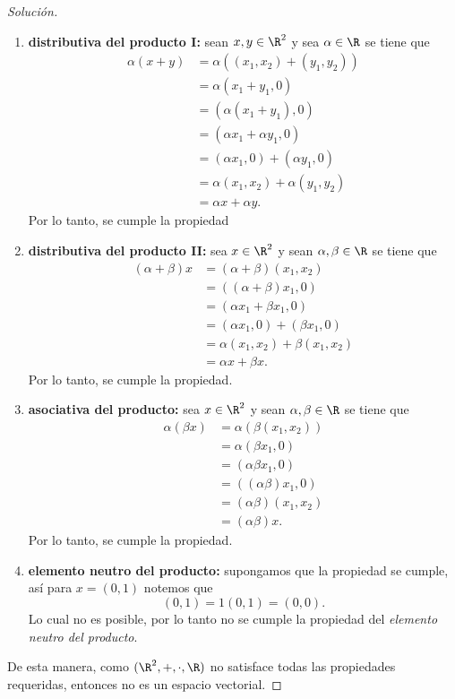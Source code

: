 \documentclass[a4,11pt]{aleph-notas}
\begin{document}
\begin{proof}[Solución]
\begin{enumerate}
    \item \textbf{distributiva del producto I:}
        sean $x,y\in \R^2$ y sea $\alpha\in \R$ se tiene que
        \begin{align*}
            \alpha (x+y) & = \alpha ((x_1,x_2)+(y_1,y_2)) \\
            & = \alpha (x_1+y_1,0)\\
            & = (\alpha(x_1+y_1),0) \\
            & = (\alpha x_1 + \alpha y_1,0)\\
            & = (\alpha x_1,0) + (\alpha y_1,0)\\
            & = \alpha(x_1,x_2) + \alpha (y_1,y_2)\\
            & = \alpha x + \alpha y.
        \end{align*}
        Por lo tanto, se cumple la propiedad
    \item \textbf{distributiva del producto II:}
        sea $x\in \R^2$ y sean $\alpha,\beta\in \R$ se tiene que
        \begin{align*}
            (\alpha + \beta) x & = (\alpha + \beta) (x_1,x_2)\\
            & = ((\alpha + \beta) x_1,0)\\
            & = (\alpha x_1 + \beta x_1,0)\\
            & = (\alpha x_1,0) + (\beta x_1,0)\\
            & = \alpha(x_1,x_2) + \beta (x_1,x_2)\\
            & = \alpha x + \beta x.
        \end{align*}
        Por lo tanto, se cumple la propiedad.
    \item \textbf{asociativa del producto:}
        sea $x\in \R^2$ y sean $\alpha,\beta\in \R$ se tiene que
        \begin{align*}
            \alpha (\beta x) & = \alpha (\beta (x_1,x_2)) \\
                & = \alpha (\beta x_1,0)\\
                & = (\alpha \beta x_1,0)\\
                & = ((\alpha \beta) x_1,0)\\
                & = (\alpha \beta)(x_1,x_2)\\
                & = (\alpha \beta) x.
        \end{align*}
        Por lo tanto, se cumple la propiedad. 
    \item \textbf{elemento neutro del producto:} supongamos que la propiedad se cumple, así para $x=(0,1)$ notemos que 
    \[
        (0,1) = 1(0,1) = (0,0).
    \]
    Lo cual no es posible, por lo tanto no se cumple la propiedad del \emph{elemento neutro del producto}.
    \end{enumerate}
    De esta manera, como $(\R^2,+,\cdot,\R)$ no satisface todas las propiedades requeridas, entonces no es un espacio vectorial. \qedhere
    
\end{proof}
\end{document}

